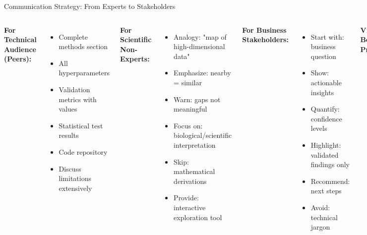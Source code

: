 \documentclass[aspectratio=169]{beamer}
\begin{document}
\begin{frame}{Communication Strategy: From Experts to Stakeholders}
\begin{columns}
\textbf{For Technical Audience (Peers):}

\begin{itemize}
\item Complete methods section
\item All hyperparameters
\item Validation metrics with values
\item Statistical test results
\item Code repository
\item Discuss limitations extensively
\end{itemize}

\textbf{For Scientific Non-Experts:}

\begin{itemize}
\item Analogy: "map of high-dimensional data"
\item Emphasize: nearby = similar
\item Warn: gaps not meaningful
\item Focus on: biological/scientific interpretation
\item Skip: mathematical derivations
\item Provide: interactive exploration tool
\end{itemize}

\textbf{For Business Stakeholders:}

\begin{itemize}
\item Start with: business question
\item Show: actionable insights
\item Quantify: confidence levels
\item Highlight: validated findings only
\item Recommend: next steps
\item Avoid: technical jargon
\end{itemize}

\textbf{Visualization Best Practices:}

\end{columns}
\end{frame}
\end{document}
